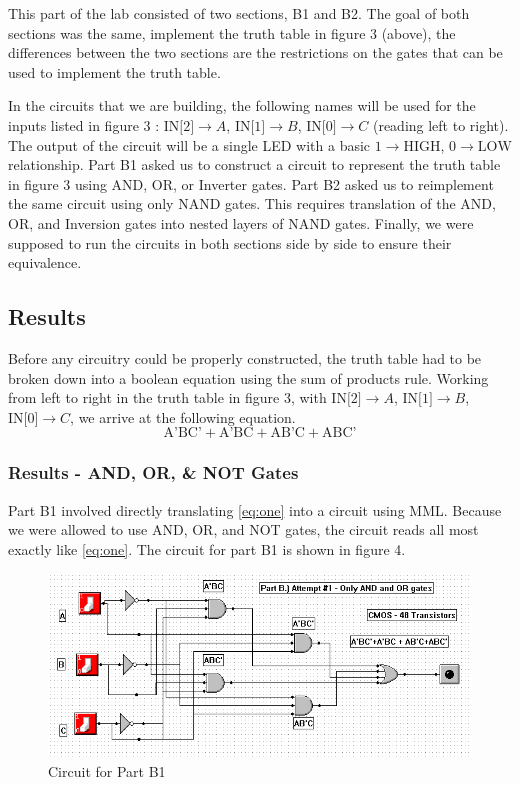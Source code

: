 \documentclass[a4paper,11pt]{article}
\begin{document}
This part of the lab consisted of two sections, B1 and B2. The goal of both sections was the same, implement the truth table in figure 3 (above), the differences between the two sections are the restrictions on the gates that can be used to implement the truth table. \par
In the circuits that we are building, the following names will be used for the inputs listed in figure 3 : $\text{IN[2]} \to A$, $\text{IN[1]} \to B$, $\text{IN[0]} \to C$ (reading left to right). The output of the circuit will be a single LED with a basic $1 \to \text{HIGH}$, $0 \to \text{LOW}$ relationship. Part B1 asked us to construct a circuit to represent the truth table in figure 3 using AND, OR, or Inverter gates. Part B2 asked us to reimplement the same circuit using only NAND gates. This requires translation of the AND, OR, and Inversion gates into nested layers of NAND gates. Finally, we were supposed to run the circuits in both sections side by side to ensure their equivalence. 

\subsection{Results}
Before any circuitry could be properly constructed, the truth table had to be broken down into a boolean equation using the sum of products rule. Working from left to right in the truth table in figure 3, with $\text{IN[2]} \to A$, $\text{IN[1]} \to B$, $\text{IN[0]} \to C$, we arrive at the following equation.
 \begin{equation}\label{eq:one} \text{A'BC'} + \text{A'BC} + \text{AB'C} + \text{ABC'} \end{equation}

\subsubsection{Results - AND, OR, \& NOT Gates} 
Part B1 involved directly translating \eqref{eq:one} into a circuit using MML. Because we were allowed to use AND, OR, and NOT gates, the circuit reads all most exactly like \eqref{eq:one}. The circuit for part B1 is shown in figure 4.

\begin{figure}[h!]
   \centering
     \includegraphics[width=6in]{PartB1Circuit}
   \caption{Circuit for Part B1}
   \label{fig:b1circuit}
\end{figure} 
\end{document}
